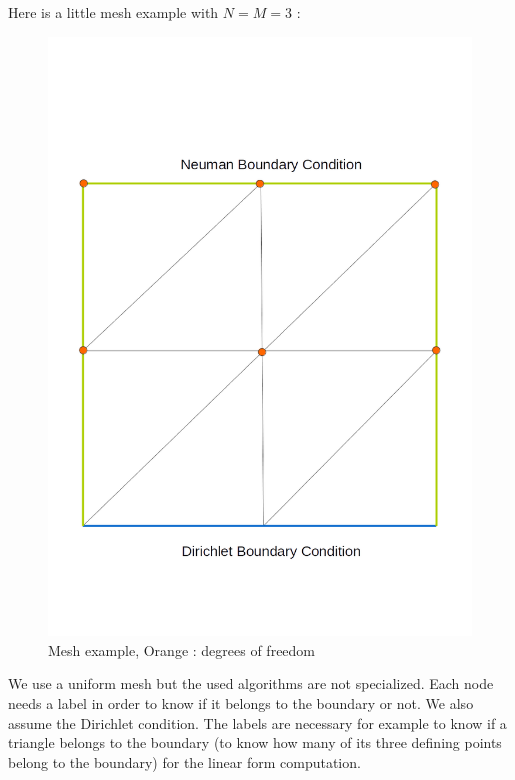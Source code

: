 \documentclass[a4paper]{report}
\begin{document}
Here is a  little mesh example with $N=M=3$ :
\begin{figure}[H]
\begin{center}
\includegraphics[scale=0.30]{mesh.png}\caption{Mesh example, Orange : degrees of freedom}
\end{center}
\end{figure}

We use a uniform mesh but the used algorithms are not specialized. Each node needs a label in order to know if it belongs to the boundary or not. We also assume the Dirichlet condition.
The labels are necessary for example to know if a triangle belongs to the boundary (to know how many of its three defining points belong to the boundary) for the linear form computation.
\end{document}
